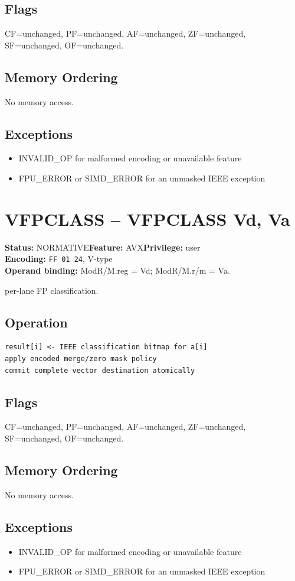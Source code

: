 \documentclass[10pt]{article}
\begin{document}
\subsection*{Flags}
CF=unchanged, PF=unchanged, AF=unchanged, ZF=unchanged, SF=unchanged, OF=unchanged.
\subsection*{Memory Ordering}
No memory access.
\subsection*{Exceptions}
\begin{itemize}
\item INVALID\_OP for malformed encoding or unavailable feature
\item FPU\_ERROR or SIMD\_ERROR for an unmasked IEEE exception
\end{itemize}
\clearpage

\section{VFPCLASS -- VFPCLASS Vd, Va}
\textbf{Status:} NORMATIVE\quad \textbf{Feature:} AVX\quad \textbf{Privilege:} user\\
\textbf{Encoding:} \texttt{FF 01 24}, V-type\\
\textbf{Operand binding:} ModR/M.reg = Vd; ModR/M.r/m = Va.

per-lane FP classification.

\subsection*{Operation}
\begin{lstlisting}
result[i] <- IEEE classification bitmap for a[i]
apply encoded merge/zero mask policy
commit complete vector destination atomically
\end{lstlisting}
\subsection*{Flags}
CF=unchanged, PF=unchanged, AF=unchanged, ZF=unchanged, SF=unchanged, OF=unchanged.
\subsection*{Memory Ordering}
No memory access.
\subsection*{Exceptions}
\begin{itemize}
\item INVALID\_OP for malformed encoding or unavailable feature
\item FPU\_ERROR or SIMD\_ERROR for an unmasked IEEE exception
\end{itemize}
\clearpage
\end{document}
